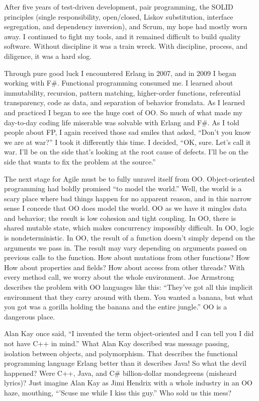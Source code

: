 \documentclass{book}
\begin{document}
After five years of test-driven development, pair programming, the SOLID principles (single responsibility, open/closed, Liskov substitution, interface segregation, and dependency inversion), and Scrum, my hope had mostly worn away. I continued to fight my tools, and it remained difficult to build quality software. Without discipline it was a train wreck. With discipline, process, and diligence, it was a hard slog.

Through pure good luck I encountered Erlang in 2007, and in 2009 I began working with F\#. Functional programming consumed me. I learned about immutability, recursion, pattern matching, higher-order functions, referential transparency, code as data, and separation of behavior fromdata. As I learned and practiced I began to see the huge cost of OO. So much of what made my day-to-day coding life miserable was solvable with Erlang and F\#. As I told people about FP, I again received those sad smiles that asked, “Don’t you know we are at war?” I took it differently this time. I decided, “OK, sure. Let’s call it war. I’ll be on the side that’s looking at the root cause of defects. I’ll be on the side that wants to fix the problem at the source.”

The next stage for Agile must be to fully unravel itself from OO. Object-oriented programming had boldly promised “to model the world.” Well, the world is a scary place where bad things happen for no apparent reason, and in this narrow sense I concede that OO does model the world. OO as we have it mingles data and behavior; the result is low cohesion and tight coupling. In OO, there is shared mutable state, which makes concurrency impossibly difficult. In OO, logic is nondeterministic. In OO, the result of a function doesn’t simply depend on the arguments we pass in. The result may vary depending on arguments passed on previous calls to the function. How about mutations from other functions? How How about properties and fields? How about access from other threads? With every method call, we worry about the whole environment. Joe Armstrong describes the problem with OO languages like this: “They’ve got all this implicit environment that they carry around with them. You wanted a banana, but what you got was a gorilla holding the banana and the entire jungle.” OO is a dangerous place.

Alan Kay once said, “I invented the term object-oriented and I can tell you I did not have C++ in mind.” What Alan Kay described was message passing, isolation between objects, and polymorphism. That describes the functional programming language Erlang better than it describes Java! So what the devil happened? Were C++, Java, and C\# billion-dollar mondegreens (misheard lyrics)? Just imagine Alan Kay as Jimi Hendrix with a whole industry in an OO haze, mouthing, “’Scuse me while I kiss this guy.” Who sold us this mess?
\end{document}
